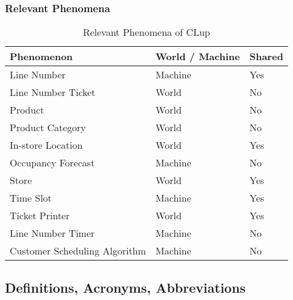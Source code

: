 \subsubsection{Relevant Phenomena}

\begin{table}[H]
    \begin{tabular}{|p{4cm}|p{4cm}|p{4cm}|}
        \hline
        \textbf{Phenomenon}    & \textbf{World / Machine}       & \textbf{Shared } \\ \hline
        Line Number & Machine & Yes \\ \hline
        Line Number Ticket & World & No \\ \hline
        Product & World & No \\ \hline
        Product Category & World & No \\ \hline
        In-store Location & World & Yes \\ \hline
        Occupancy Forecast & Machine & No \\ \hline
        Store & World & Yes \\ \hline
        Time Slot & Machine & Yes \\ \hline
        Ticket Printer & World & Yes \\ \hline
        Line Number Timer & Machine & No \\ \hline
        Customer Scheduling Algorithm & Machine & No \\ \hline
    \end{tabular}
    \caption{Relevant Phenomena of CLup}
\end{table}



\subsection{Definitions, Acronyms, Abbreviations}
